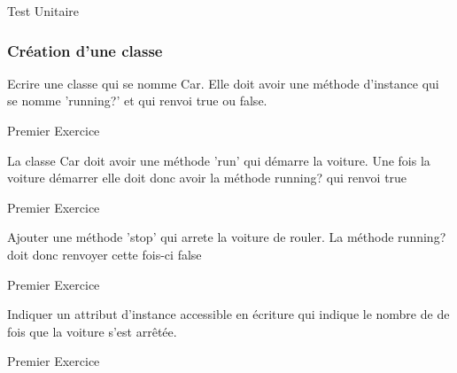 \documentclass{beamer}
\begin{document}
\begin{frame}
  \begin{beamerboxesrounded}{Test Unitaire}
    
  \end{beamerboxesrounded}
\end{frame}

\begin{frame}
  \frametitle{Cr\'eation d'une classe}
  Ecrire une classe qui se nomme Car. Elle doit avoir une m\'ethode d'instance qui
  se nomme 'running?' et qui renvoi true ou false.
\end{frame}

\begin{frame}
  \begin{beamerboxesrounded}{Premier Exercice}
    
  \end{beamerboxesrounded}
\end{frame}

\begin{frame}
  La classe Car doit avoir une m\'ethode 'run' qui d\'emarre la voiture.
  Une fois la voiture d\'emarrer elle doit donc avoir la m\'ethode running? qui
  renvoi true
\end{frame}
\begin{frame}
  \begin{beamerboxesrounded}{Premier Exercice}
    
  \end{beamerboxesrounded}
\end{frame}

\begin{frame}
  Ajouter une m\'ethode 'stop' qui arrete la voiture de rouler. La m\'ethode running?
  doit donc renvoyer cette fois-ci false
\end{frame}
\begin{frame}
  \begin{beamerboxesrounded}{Premier Exercice}
    
  \end{beamerboxesrounded}
\end{frame}

\begin{frame}
  Indiquer un attribut d'instance accessible en \'ecriture qui indique le nombre de
  de fois que la voiture s'est arrêt\'ee.
\end{frame}
\begin{frame}
  \begin{beamerboxesrounded}{Premier Exercice}
    
  \end{beamerboxesrounded}
\end{frame}
\end{document}
